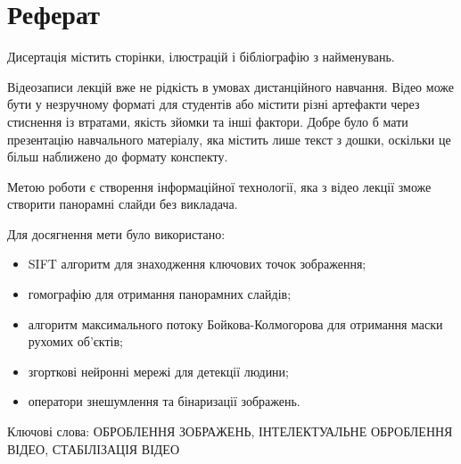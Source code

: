 \chapter*{Реферат}

Дисертація містить
\pageref{LastPage}
сторінки,
ілюстрацій
і бібліографію з
найменувань.

Відеозаписи лекцій вже не рідкість в умовах дистанційного навчання.
Відео може бути у незручному форматі для студентів або містити різні артефакти
через стиснення із втратами, якість зйомки та  інші фактори. Добре було б мати
презентацію навчального матеріалу, яка містить лише текст з дошки,
оскільки це більш наближено до формату конспекту.

Метою роботи є створення інформаційної технології, яка з відео лекції
зможе створити панорамні слайди без викладача.

Для досягнення мети було використано:
\begin{itemize}
  \item
        SIFT алгоритм для знаходження ключових точок зображення;
  \item   
        гомографію для отримання панорамних слайдів;
  \item
        алгоритм максимального потоку Бойкова-Колмогорова
        для отримання маски рухомих об'єктів;
  \item
        згорткові нейронні мережі для детекції людини;
  \item
        оператори знешумлення та бінаризації зображень.
\end{itemize}

Ключові слова:
\MakeUppercase{оброблення зображень, інтелектуальне оброблення відео,
  стабілізація відео}
